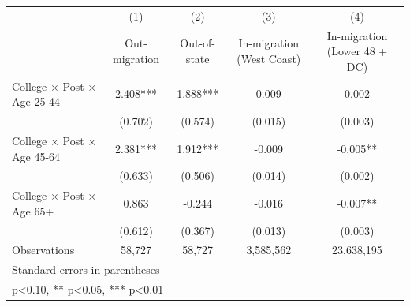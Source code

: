 {
\def\sym#1{\ifmmode^{#1}\else\(^{#1}\)\fi}
\begin{tabular}{l*{4}{c}}
\hline\hline
            &\multicolumn{1}{c}{(1)}&\multicolumn{1}{c}{(2)}&\multicolumn{1}{c}{(3)}&\multicolumn{1}{c}{(4)}\\
            &\multicolumn{1}{c}{Out-migration}&\multicolumn{1}{c}{Out-of-state}&\multicolumn{1}{c}{In-migration (West Coast)}&\multicolumn{1}{c}{In-migration (Lower 48 + DC)}\\
\hline
College $\times$ Post $\times$ Age 25-44&       2.408***&       1.888***&       0.009   &       0.002   \\
            &     (0.702)   &     (0.574)   &     (0.015)   &     (0.003)   \\
[1em]
College $\times$ Post $\times$ Age 45-64&       2.381***&       1.912***&      -0.009   &      -0.005** \\
            &     (0.633)   &     (0.506)   &     (0.014)   &     (0.002)   \\
[1em]
College $\times$ Post $\times$ Age 65+&       0.863   &      -0.244   &      -0.016   &      -0.007** \\
            &     (0.612)   &     (0.367)   &     (0.013)   &     (0.003)   \\
\hline
Observations&      58,727   &      58,727   &   3,585,562   &  23,638,195   \\
\hline\hline
\multicolumn{5}{l}{\footnotesize Standard errors in parentheses}\\
\multicolumn{5}{l}{\footnotesize * p<0.10, ** p<0.05, *** p<0.01}\\
\end{tabular}
}
